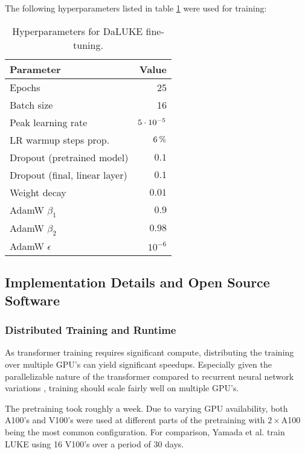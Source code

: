 \documentclass[main.tex]{subfiles}
\begin{document}
The following hyperparameters listed in table \ref{tab:finetune-hyper} were used for training:
\begin{table}[H]
    \centering
    \begin{tabular}{l|r}
        Parameter  &    Value\\\hline
        Epochs     & 25\\
        Batch size &    16\\
        Peak learning rate & $5\cdot10^{-5}$\\
        LR warmup steps prop. & $ 6\:\text{\%{}} $\\
        Dropout (pretrained model) & $ 0.1 $\\
        Dropout (final, linear layer) & $ 0.1 $\\
        Weight decay & $ 0.01 $\\
        AdamW $ \beta_1 $ & $ 0.9 $\\
        AdamW $ \beta_2 $ & $ 0.98 $\\
        AdamW $ \epsilon $ & $ 10^{-6} $
    \end{tabular}
    \caption{Hyperparameters for DaLUKE fine-tuning.}\label{tab:finetune-hyper}
\end{table}\noindent

\subsection{Implementation Details and Open Source Software}%
\label{sub:oss}
\subsubsection{Distributed Training and Runtime}
As transformer training requires significant compute, distributing the training over multiple GPU's can yield significant speedups.
Especially given the parallelizable nature of the transformer compared to recurrent neural network variations \cite{vaswani2017att}, training should scale fairly well on multiple GPU's.

The pretraining took roughly a week.
Due to varying GPU availability, both A100's and V100's were used at different parts of the pretraining with $ 2\times $A100 being the most common configuration.
For comparison, Yamada et al. train LUKE using 16 V100's over a period of 30 days. \cite{yamada2020luke}
\end{document}

